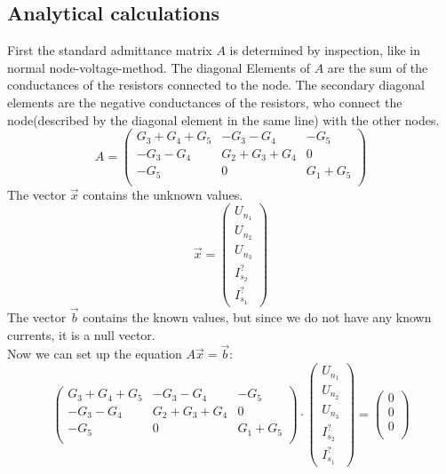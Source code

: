 \documentclass[a4paper]{article}
\begin{document}
\subsection{Analytical calculations}
First the standard admittance matrix $A$ is determined by inspection, like in normal node-voltage-method.
The diagonal Elements of $A$ are the sum of the conductances of the resistors connected to the
node. The secondary diagonal elements are the negative conductances of the resistors, who connect
the node(described by the diagonal element in the same line) with the other nodes.
\begin{equation}
      A=
      \begin{pmatrix}
            G_3 + G_4 + G_5 & -G_3 - G_4 & -G_5\\
            -G_3 -G_4 & G_2 + G_3 + G_4 & 0\\
            -G_5 & 0 & G_1 + G_5\\
      \end{pmatrix}
\end{equation}
The vector $\vec{x}$ contains the unknown values.
\begin{equation}
      \vec{x}=
      \begin{pmatrix}
            U_{n_1}\\U_{n_2}\\U_{n_3}\\I_{s_2}^?\\I_{s_1}^?
      \end{pmatrix}
\end{equation}
The vector $\vec{b}$ contains the known values, but since we do not have any known currents,
it is a null vector.\\
Now we can set up the equation $A\vec{x} = \vec{b}$:
\begin{equation}
      \begin{pmatrix}
            G_3 + G_4 + G_5 & -G_3 - G_4 & -G_5\\
            -G_3 -G_4 & G_2 + G_3 + G_4 & 0\\
            -G_5 & 0 & G_1 + G_5\\
      \end{pmatrix}
      \cdot
      \begin{pmatrix}
            U_{n_1}\\U_{n_2}\\U_{n_3}\\I_{s_2}^?\\I_{s_1}^?
      \end{pmatrix}
      =
      \begin{pmatrix}
            0\\0\\0\\
      \end{pmatrix}
\end{equation}
\end{document}
